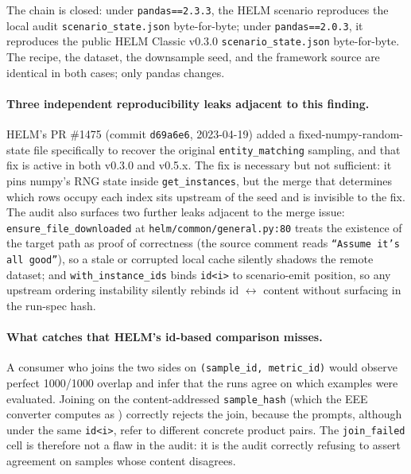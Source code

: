 The chain is closed: under \texttt{pandas==2.3.3}, the HELM scenario
  reproduces the local audit \texttt{scenario\_state.json} byte-for-byte;
  under \texttt{pandas==2.0.3}, it reproduces the public HELM Classic
  v0.3.0 \texttt{scenario\_state.json} byte-for-byte.
The recipe, the dataset, the downsample seed, and the framework source
  are identical in both cases; only pandas changes.

\paragraph{Three independent reproducibility leaks adjacent to this
  finding.}
HELM's PR \#1475 (commit \texttt{d69a6e6}, 2023-04-19) added a
  fixed-numpy-random-state file specifically to recover the original
  \texttt{entity\_matching} sampling, and that fix is active in both
  v0.3.0 and v0.5.x.
The fix is necessary but not sufficient: it pins numpy's RNG state
  inside \texttt{get\_instances}, but the merge that determines which
  rows occupy each index sits upstream of the seed and is invisible
  to the fix.
The audit also surfaces two further leaks adjacent to the merge issue:
  \texttt{ensure\_file\_downloaded} at
  \texttt{helm/common/general.py:80} treats the existence of the
  target path as proof of correctness (the source comment reads
  \texttt{``Assume it's all good''}), so a stale or corrupted local
  cache silently shadows the remote dataset; and
  \texttt{with\_instance\_ids} binds \texttt{id<i>} to scenario-emit
  position, so any upstream ordering instability silently rebinds
  id $\leftrightarrow$ content without surfacing in the run-spec hash.

\paragraph{What \eee{} catches that HELM's id-based comparison misses.}
A consumer who joins the two sides on \texttt{(sample\_id, metric\_id)}
  would observe perfect 1000/1000 overlap and infer that the runs
  agree on which examples were evaluated.
Joining on the content-addressed \texttt{sample\_hash} (which the EEE
  converter computes as
  ) correctly
  rejects the join, because the prompts, although under the same
  \texttt{id<i>}, refer to different concrete product pairs.
The \texttt{join\_failed} cell is therefore not a flaw in the audit: it
  is the audit correctly refusing to assert agreement on samples whose
  content disagrees.


